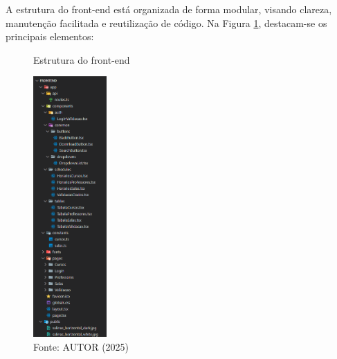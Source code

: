 A estrutura do front-end está organizada de forma modular, visando clareza, manutenção facilitada e reutilização de código. Na Figura \ref{fig_front_14}, destacam-se os principais elementos:

\begin{figure}[htb]
    \centering
    \caption{Estrutura do front-end}
    \includegraphics[width=0.25\textwidth]{Figuras/front-14.png}
    \caption*{Fonte: AUTOR (2025)}
    \label{fig_front_14}
\end{figure}


